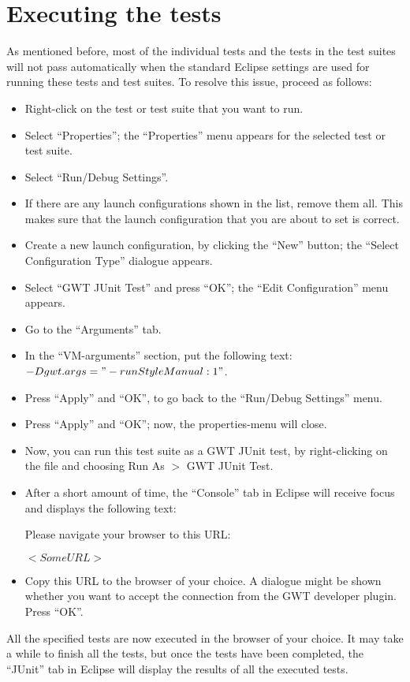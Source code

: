 \section{Executing the tests}\label{sec:exectest}
As mentioned before, most of the individual tests and the tests in the test suites will not pass automatically when the standard Eclipse settings are used for running these tests and test suites. To resolve this issue, proceed as follows:
\begin{itemize}
	\item Right-click on the test or test suite that you want to run.
	\item Select ``Properties''; the ``Properties'' menu appears for the selected test or test suite.
	\item Select ``Run/Debug Settings''. 
	\item If there are any launch configurations shown in the list, remove them all. This makes sure that the launch configuration that you are about to set is correct.
	\item Create a new launch configuration, by clicking the ``New'' button; the ``Select Configuration Type'' dialogue appears.
	\item Select ``GWT JUnit Test'' and press ``OK''; the ``Edit Configuration'' menu appears.
	\item Go to the ``Arguments'' tab.
	\item In the ``VM-arguments'' section, put the following text: $-Dgwt.args="-runStyle Manual:1"$.
	\item Press ``Apply'' and ``OK'', to go back to the ``Run/Debug Settings'' menu.
	\item Press ``Apply'' and ``OK''; now, the properties-menu will close.
	\item Now, you can run this test suite as a GWT JUnit test, by right-clicking on the file and choosing Run As $>$ GWT JUnit Test.
	\item After a short amount of time, the ``Console'' tab in Eclipse will receive focus and displays the following text:

	\noindent Please navigate your browser to this URL:

	\noindent $<Some URL>$
	\item Copy this URL to the browser of your choice. A dialogue might be shown whether you want to accept the connection from the GWT developer plugin. Press ``OK''.
\end{itemize}

\fpstartparagraph{} All the specified tests are now executed in the browser of your choice. It may take a while to finish all the tests, but once the tests have been completed, the ``JUnit'' tab in Eclipse will display the results of all the executed tests.

